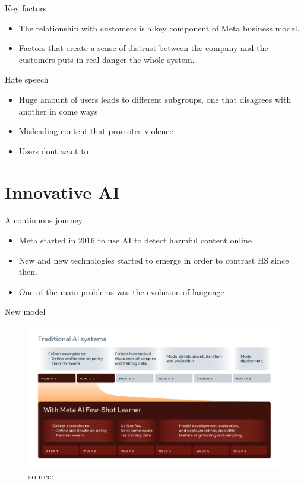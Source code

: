 \documentclass{beamer}
\begin{document}
\begin{frame}{Key factors}
  \begin{itemize}
  \item The relationship with customers is a key component of Meta
    business model.
  \item Factors that create a sense of distrust between the company
    and the customers puts in real danger the whole system.
  \end{itemize}
\end{frame}

\begin{frame}{Hate speech}
  \begin{itemize}
  \item Huge amount of users leads to different subgroups, one that
    disagrees with another in come ways
  \item Misleading content that promotes violence \pause
  \item Users dont want to 
  \end{itemize}
\end{frame}

\section{Innovative AI}
\begin{frame}{A continuous journey}
  \begin{itemize}
  \item Meta started in 2016 to use AI to detect harmful content
    online
  \item New and new technologies started to emerge in order to
    contrast HS since then.
  \item One of the main problems was the evolution of language
  \end{itemize}
\end{frame}

\begin{frame}{New model}
  \begin{figure}
    \centering
    \includegraphics[width=.8\textwidth]{images/fsl_timeline}
    \caption{source: \cite{site:AIart2}}
  \end{figure}
\end{frame}
\end{document}
